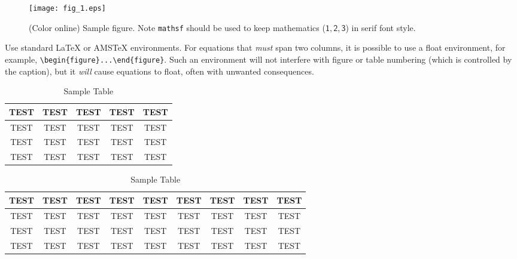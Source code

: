\documentclass[10pt,letterpaper,optenglett,fleqn]{article}      %
\begin{document}
\begin{figure}
\centerline{\texttt{[image: fig\_1.eps]}}
\caption{(Color online) Sample figure. Note \texttt{mathsf} should
be used to keep mathematics ($\mathsf{1, 2, 3}$) in serif font
style.} \label{fig:opteng-fig01}
\end{figure}

Use standard LaTeX or AMSTeX environments. For equations that
\textit{must} span two columns, it is possible to use a float
environment, for example, \verb+\begin{figure*}...\end{figure*}+.
Such an environment will not interfere with figure or table
numbering (which is controlled by the caption), but it \textit{will}
cause equations to float, often with unwanted consequences.

\begin{table}
\label{tab:opteng-tab01}  \centering
  \caption{Sample Table}\begin{tabular}{ccccc} \\ \hline
    TEST & TEST & TEST & TEST & TEST \\ \hline
    TEST & TEST & TEST & TEST & TEST \\
    TEST & TEST & TEST & TEST & TEST \\
    TEST & TEST & TEST & TEST & TEST \\ \hline
  \end{tabular}
\end{table}

\begin{table*}
\label{tab:opteng-tab02}  \centering
  \caption{Sample Table}\begin{tabular}{ccccccccc} \\ \hline
    TEST & TEST & TEST & TEST & TEST & TEST & TEST & TEST & TEST\\ \hline
    TEST & TEST & TEST & TEST & TEST & TEST & TEST & TEST & TEST\\
    TEST & TEST & TEST & TEST & TEST & TEST & TEST & TEST & TEST\\
    TEST & TEST & TEST & TEST & TEST & TEST & TEST & TEST & TEST\\ \hline
  \end{tabular}
\end{table*}
\end{document}
